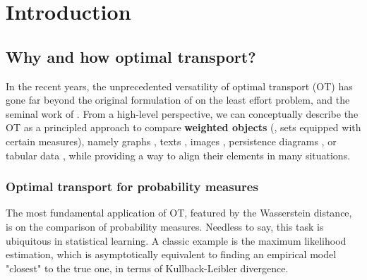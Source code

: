 \chapter[Introduction]{Introduction}


\renewcommand{\contentsname}{Contents}
\localtableofcontents*
{}


\section{Why and how optimal transport?}

In the recent years, the unprecedented versatility of optimal transport (OT) has gone far beyond
the original formulation of \citet{Monge81} on the least effort problem,
and the seminal work of \citet{Kanto42}. From a high-level perspective, we can
conceptually describe the OT as a principled approach to compare \textbf{weighted objects}
(\ie, sets equipped with certain measures), namely graphs \citep{Nikolentzos17},
texts \citep{Kusner15}, images \citep{Arjovsky17}, persistence diagrams \citep{Edelsbrunner02},
or tabular data \citep{Redko20}, while providing a way to align their elements in many situations.

\subsection{Optimal transport for probability measures}
The most fundamental application of OT, featured by the Wasserstein distance,
is on the comparison of probability measures. Needless to say,
this task is ubiquitous in statistical learning. A classic example is
the maximum likelihood estimation,
which is asymptotically equivalent to finding an empirical model "closest" to the true one,
in terms of Kullback-Leibler divergence.

